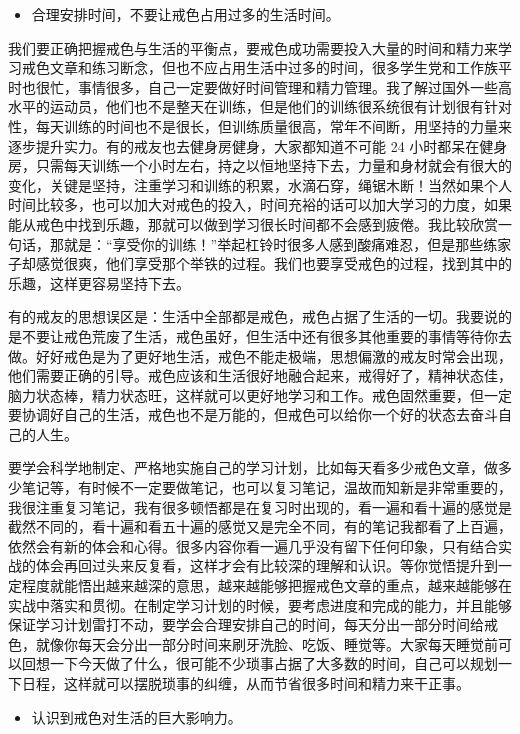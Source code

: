 \begin{itemize}
    \item 合理安排时间，不要让戒色占用过多的生活时间。
\end{itemize}

我们要正确把握戒色与生活的平衡点，要戒色成功需要投入大量的时间和精力来学习戒色文章和练习断念，但也不应占用生活中过多的时间，很多学生党和工作族平时也很忙，事情很多，自己一定要做好时间管理和精力管理。我了解过国外一些高水平的运动员，他们也不是整天在训练，但是他们的训练很系统很有计划很有针对性，每天训练的时间也不是很长，但训练质量很高，常年不间断，用坚持的力量来逐步提升实力。有的戒友也去健身房健身，大家都知道不可能 24 小时都呆在健身房，只需每天训练一个小时左右，持之以恒地坚持下去，力量和身材就会有很大的变化，关键是坚持，注重学习和训练的积累，水滴石穿，绳锯木断！当然如果个人时间比较多，也可以加大对戒色的投入，时间充裕的话可以加大学习的力度，如果能从戒色中找到乐趣，那就可以做到学习很长时间都不会感到疲倦。我比较欣赏一句话，那就是：“享受你的训练！”举起杠铃时很多人感到酸痛难忍，但是那些练家子却感觉很爽，他们享受那个举铁的过程。我们也要享受戒色的过程，找到其中的乐趣，这样更容易坚持下去。

有的戒友的思想误区是：生活中全部都是戒色，戒色占据了生活的一切。我要说的是不要让戒色荒废了生活，戒色虽好，但生活中还有很多其他重要的事情等待你去做。好好戒色是为了更好地生活，戒色不能走极端，思想偏激的戒友时常会出现，他们需要正确的引导。戒色应该和生活很好地融合起来，戒得好了，精神状态佳，脑力状态棒，精力状态旺，这样就可以更好地学习和工作。戒色固然重要，但一定要协调好自己的生活，戒色也不是万能的，但戒色可以给你一个好的状态去奋斗自己的人生。

要学会科学地制定、严格地实施自己的学习计划，比如每天看多少戒色文章，做多少笔记等，有时候不一定要做笔记，也可以复习笔记，温故而知新是非常重要的，我很注重复习笔记，我有很多顿悟都是在复习时出现的，看一遍和看十遍的感觉是截然不同的，看十遍和看五十遍的感觉又是完全不同，有的笔记我都看了上百遍，依然会有新的体会和心得。很多内容你看一遍几乎没有留下任何印象，只有结合实战的体会再回过头来反复看，这样才会有比较深的理解和认识。等你觉悟提升到一定程度就能悟出越来越深的意思，越来越能够把握戒色文章的重点，越来越能够在实战中落实和贯彻。在制定学习计划的时候，要考虑进度和完成的能力，并且能够保证学习计划雷打不动，要学会合理安排自己的时间，每天分出一部分时间给戒色，就像你每天会分出一部分时间来刷牙洗脸、吃饭、睡觉等。大家每天睡觉前可以回想一下今天做了什么，很可能不少琐事占据了大多数的时间，自己可以规划一下日程，这样就可以摆脱琐事的纠缠，从而节省很多时间和精力来干正事。

\begin{itemize}
    \item 认识到戒色对生活的巨大影响力。
\end{itemize}

